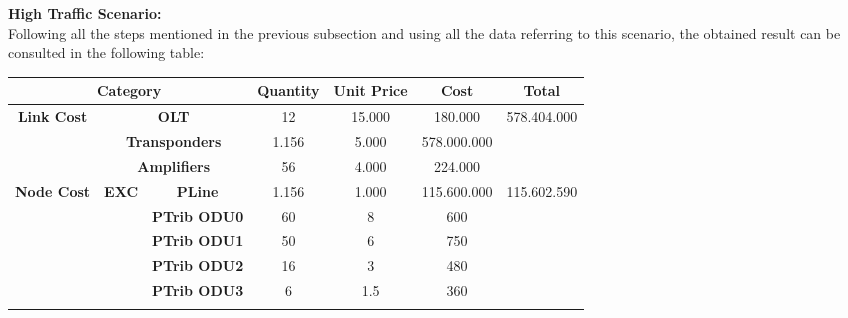 \textbf{High Traffic Scenario:}\\

Following all the steps mentioned in the previous subsection and using all the data referring to this scenario, the obtained result can be consulted in the following table:

\begin{table}[H]
\centering
\label{opaque_high_traffic}
\begin{tabular}{|c|c|c|c|c|c|c|}
\hline
\multicolumn{3}{|c|}{\textbf{Category}}                                                   & \textbf{Quantity} & \textbf{Unit Price} & \textbf{Cost} & \textbf{Total}               \\ \hline
\multirow{3}{*}{\textbf{Link Cost}} & \multicolumn{2}{c|}{\textbf{OLT}}                   & 12                & 15.000              & 180.000       & \multirow{3}{*}{578.404.000} \\ \cline{2-6}
                                    & \multicolumn{2}{c|}{\textbf{Transponders}}          & 1.156             & 5.000               & 578.000.000   &                              \\ \cline{2-6}
                                    & \multicolumn{2}{c|}{\textbf{Amplifiers}}            & 56                & 4.000               & 224.000       &                              \\ \hline
\multirow{8}{*}{\textbf{Node Cost}} & \multirow{6}{*}{\textbf{EXC}} & \textbf{PLine}      & 1.156             & 1.000                & 115.600.000   & \multirow{8}{*}{115.602.590} \\ \cline{3-6}
                                    &                               & \textbf{PTrib ODU0} & 60                & 8                   & 600           &                              \\ \cline{3-6}
                                    &                               & \textbf{PTrib ODU1} & 50                & 6                   & 750           &                              \\ \cline{3-6}
                                    &                               & \textbf{PTrib ODU2} & 16                & 3                   & 480           &                              \\ \cline{3-6}
                                    &                               & \textbf{PTrib ODU3} & 6                 & 1.5                 & 360           &                              \\ \cline{3-6}

\end{tabular}
\end{table}
